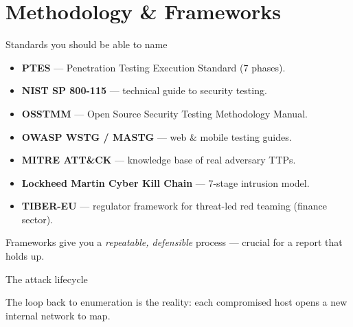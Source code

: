 \documentclass[aspectratio=169,11pt]{beamer}
\begin{document}
\section{Methodology \& Frameworks}

\begin{frame}{Standards you should be able to name}
  \begin{itemize}
    \item \textbf{PTES} --- Penetration Testing Execution Standard (7 phases).
    \item \textbf{NIST SP 800-115} --- technical guide to security testing.
    \item \textbf{OSSTMM} --- Open Source Security Testing Methodology Manual.
    \item \textbf{OWASP WSTG / MASTG} --- web \& mobile testing guides.
    \item \textbf{MITRE ATT\&CK} --- knowledge base of real adversary TTPs.
    \item \textbf{Lockheed Martin Cyber Kill Chain} --- 7-stage intrusion model.
    \item \textbf{TIBER-EU} --- regulator framework for threat-led red teaming
          (finance sector).
  \end{itemize}
  \footnotesize Frameworks give you a \emph{repeatable, defensible} process ---
  crucial for a report that holds up.
\end{frame}

\begin{frame}{The attack lifecycle}
  \centering
  \vspace{0.4em}
  \par\footnotesize The loop back to enumeration is the reality:
  each compromised host opens a new internal network to map.
\end{frame}
\end{document}
